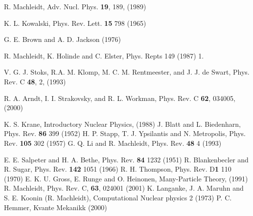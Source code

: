 \begin{thebibliography}{999}

 R. Machleidt, Adv. Nucl. Phys. {\bf{19}}, 189, (1989)

 K. L. Kowalski, Phys. Rev. Lett. {\bf{15}} 798 (1965)

 G. E. Brown and A. D. Jackson (1976)

 R. Machleidt, K. Holinde and C. Elster, Phys. Repts 149 (1987) 1.

 V. G. J. Stoks, R.A. M. Klomp, M. C. M. Rentmeester, and J. J. de Swart,
Phys. Rev. C {\bf{48}}, 2, (1993)

 R. A. Arndt, I. I. Strakovsky, and R. L. Workman, 
Phys. Rev. C {\bf{62}}, 034005, (2000)

 K. S. Krane, Introductory Nuclear Physics, (1988)
 J. Blatt and L. Biedenharn, Phys. Rev. {\bf{86}} 399 (1952)
 H. P. Stapp, T. J. Ypsilantis and N. Metropolis, Phys. Rev. {\bf{105}} 302 (1957)
 G. Q. Li and R. Machleidt, Phys. Rev. {\bf{48}} 4 (1993)

 E. E. Salpeter and H. A. Bethe, Phys. Rev. {\bf{84}}  1232 (1951)
 R. Blankenbecler and R. Sugar, Phys. Rev. {\bf{142}} 1051 (1966)
 R. H. Thompson, Phys. Rev. D{\bf{1}} 110 (1970)
 E. K. U. Gross, E. Runge and O. Heinonen, Many-Particle Theory, (1991)
 R. Machleidt, Phys. Rev. C, {\bf{63}}, 024001 (2001)  
 K. Langanke, J. A. Maruhn and S. E. Koonin (R. Machleidt), Computational Nuclear physics 2 (1973)
 P. C. Hemmer, Kvante Mekanikk (2000)









\end{thebibliography}
